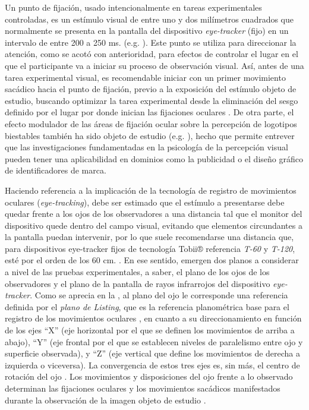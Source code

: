 \documentclass[spanish]{textolivre}
\begin{document}
Un punto de fijación, usado intencionalmente en tareas experimentales controladas, es un estímulo visual de entre uno y dos milímetros cuadrados que normalmente se presenta en la pantalla del dispositivo \textit{eye-tracker} (fijo) en un intervalo de entre 200 a 250 ms. (e.g. \textcite{hsiao_assessing_2012,marroquin-ciendua_modulacion_2020,rodriguez-martinez_ocular_2021}). Este punto se utiliza para direccionar la atención, como se acotó con anterioridad, para efectos de controlar el lugar en el que el participante va a iniciar su proceso de observación visual. Así, antes de una tarea experimental visual, es recomendable iniciar con un primer movimiento sacádico hacia el punto de fijación, previo a la exposición del estímulo objeto de estudio, buscando optimizar la tarea experimental desde la eliminación del sesgo definido por el lugar por donde inician las fijaciones oculares \cite{hornof_cleaning_2002}. De otra parte, el efecto modulador de las áreas de fijación ocular sobre la percepción de logotipos biestables también ha sido objeto de estudio (e.g. \textcite{rodriguez-martinez_can_2024}), hecho que permite entrever que las investigaciones fundamentadas en la psicología de la percepción visual pueden tener una aplicabilidad en dominios como la publicidad o el diseño gráfico de identificadores de marca.

Haciendo referencia a la implicación de la tecnología de registro de movimientos oculares (\textit{eye-tracking}), debe ser estimado que el estímulo a presentarse debe quedar frente a los ojos de los observadores a una distancia tal que el monitor del dispositivo quede dentro del campo visual, evitando que elementos circundantes a la pantalla puedan intervenir, por lo que suele recomendarse una distancia que, para dispositivos eye-tracker fijos de tecnología Tobii® referencia \textit{T-60} y \textit{T-120}, esté por el orden de los 60 cm. \cite{marroquin-ciendua_modulacion_2020}. En ese sentido, emergen dos planos a considerar a nivel de las pruebas experimentales, a saber, el plano de los ojos de los observadores y el plano de la pantalla de rayos infrarrojos del dispositivo \textit{eye-tracker}. Como se aprecia en la , al plano del ojo le corresponde una referencia definida por el \textit{plano de Listing}, que es la referencia planométrica base para el registro de los movimientos oculares \cite{arango_contaminacion_2021}, en cuanto a su direccionamiento en función de los ejes “X” (eje horizontal por el que se definen los movimientos de arriba a abajo), “Y” (eje frontal por el que se establecen niveles de paralelismo entre ojo y superficie observada), y “Z” (eje vertical que define los movimientos de derecha a izquierda o viceversa). La convergencia de estos tres ejes es, sin más, el centro de rotación del ojo \cite{furman_orientation_2003}. Los movimientos y disposiciones del ojo frente a lo observado determinan las fijaciones oculares y los movimientos sacádicos manifestados durante la observación de la imagen objeto de estudio \cite{rosa_what_2015}.
\end{document}
